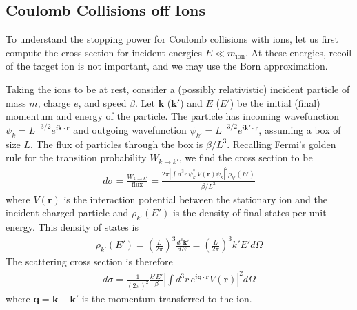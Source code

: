 \documentclass[twocolumn, preprintnumbers,amsmath,amssymb,prd, superscriptaddress]{revtex4}
\begin{document}
\begin{appendices}


\subsection{Coulomb Collisions off Ions}
To understand the stopping power for Coulomb collisions with ions, let us first compute the cross section for incident energies $E \ll m_\text{ion}$.
At these energies, recoil of the target ion is not important, and we may use the Born approximation.

Taking the ions to be at rest, consider a (possibly relativistic) incident particle of mass $m$, charge $e$, and speed $\beta$. Let $\textbf{k}$ ($\textbf{k}'$) and $E$ ($E'$) be the initial (final) momentum and energy of the particle.
The particle has incoming wavefunction $\psi_k = L^{-3/2}e^{i \textbf{k}\cdot \textbf{r}}$ and outgoing wavefunction $\psi_{k'} = L^{-3/2}e^{i \textbf{k}'\cdot \textbf{r}}$, assuming a box of size $L$.
The flux of particles through the box is $\beta/L^3$.
Recalling Fermi's golden rule for the transition probability $W_{k\to k'}$, we find the cross section to be
\begin{align}
  \label{eq:DifferentialBornCrossSection}
d\sigma = \frac{W_{k\to k'}}{\text{flux}} = \frac{2 \pi|\int d^3r \, \psi_{k'}^* V(\textbf{r})\psi_k|^2 \rho_{k'}(E')}{\beta/L^3}
\end{align}
where $V(\textbf{r})$ is the interaction potential between the stationary ion and the incident charged particle and $\rho_{k'}(E')$ is the density of final states per unit energy.
This density of states is
\begin{align}
\rho_{k'}(E') = \left( \frac{L}{2 \pi} \right)^3 \frac{d^3 \textbf{k}'}{dE'}
  = \left( \frac{L}{2 \pi} \right)^3 k' E' d \Omega
\end{align}
The scattering cross section is therefore
\begin{align}
d\sigma = \frac{1}{(2 \pi)^2} \frac{k'E'}{\beta} \left|\int d^3r \, e^{i\textbf{q}\cdot \textbf{r}}V(\textbf{r})\right|^2 d \Omega
\end{align}
where $\textbf{q} = \textbf{k} - \textbf{k}'$ is the momentum transferred to the ion.


\end{appendices}
\end{document}
